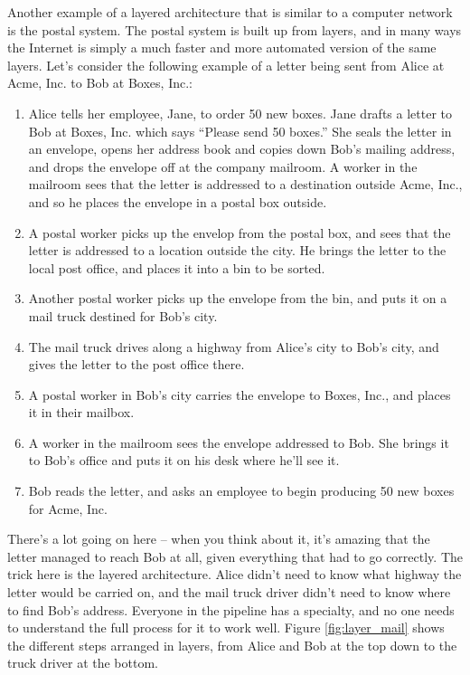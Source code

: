 Another example of a layered architecture that is similar to a computer network is the postal system. The postal system is built up from layers, and in many ways the Internet is simply a much faster and more automated version of the same layers. Let's consider the following example of a letter being sent from Alice at Acme, Inc. to Bob at Boxes, Inc.:

\begin{enumerate}
    \item Alice tells her employee, Jane, to order 50 new boxes. Jane drafts a letter to Bob at Boxes, Inc. which says ``Please send 50 boxes.'' She seals the letter in an envelope, opens her address book and copies down Bob's mailing address, and drops the envelope off at the company mailroom. A worker in the mailroom sees that the letter is addressed to a destination outside Acme, Inc., and so he places the envelope in a postal box outside.
    \item A postal worker picks up the envelop from the postal box, and sees that the letter is addressed to a location outside the city. He brings the letter to the local post office, and places it into a bin to be sorted.
    \item Another postal worker picks up the envelope from the bin, and puts it on a mail truck destined for Bob's city.
    \item The mail truck drives along a highway from Alice's city to Bob's city, and gives the letter to the post office there.
    \item A postal worker in Bob's city carries the envelope to Boxes, Inc., and places it in their mailbox.
    \item A worker in the mailroom sees the envelope addressed to Bob. She brings it to Bob's office and puts it on his desk where he'll see it.
    \item Bob reads the letter, and asks an employee to begin producing 50 new boxes for Acme, Inc.
\end{enumerate}

There's a lot going on here -- when you think about it, it's amazing that the letter managed to reach Bob at all, given everything that had to go correctly. The trick here is the layered architecture. Alice didn't need to know what highway the letter would be carried on, and the mail truck driver didn't need to know where to find Bob's address. Everyone in the pipeline has a specialty, and no one needs to understand the full process for it to work well. Figure \ref{fig:layer_mail} shows the different steps arranged in layers, from Alice and Bob at the top down to the truck driver at the bottom.

